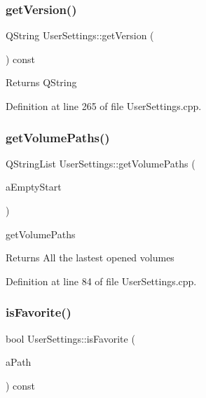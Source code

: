 \subsubsection{\texorpdfstring{get\+Version()}{getVersion()}}
{\footnotesize\ttfamily Q\+String User\+Settings\+::get\+Version (\begin{DoxyParamCaption}{ }\end{DoxyParamCaption}) const}

\begin{DoxyReturn}{Returns}
Q\+String 
\end{DoxyReturn}


Definition at line 265 of file User\+Settings.\+cpp.

\mbox{\label{class_user_settings_a9d9a36185cb549a4bfd262d489a3d6d6}} 
\subsubsection{\texorpdfstring{get\+Volume\+Paths()}{getVolumePaths()}}
{\footnotesize\ttfamily Q\+String\+List User\+Settings\+::get\+Volume\+Paths (\begin{DoxyParamCaption}\item[{const bool}]{a\+Empty\+Start }\end{DoxyParamCaption})}



get\+Volume\+Paths 

\begin{DoxyReturn}{Returns}
All the lastest opened volumes 
\end{DoxyReturn}


Definition at line 84 of file User\+Settings.\+cpp.

\mbox{\label{class_user_settings_af2853d2437e4bdfc95d7714acf3f4412}} 
\subsubsection{\texorpdfstring{is\+Favorite()}{isFavorite()}}
{\footnotesize\ttfamily bool User\+Settings\+::is\+Favorite (\begin{DoxyParamCaption}\item[{const Q\+String \&}]{a\+Path }\end{DoxyParamCaption}) const}


